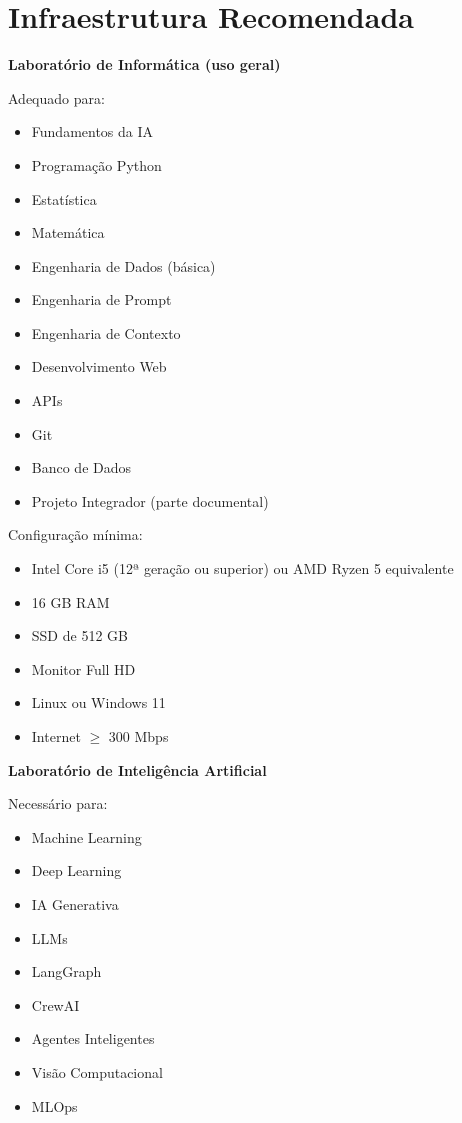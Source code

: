 \section{Infraestrutura Recomendada}

\textbf{Laboratório de Informática (uso geral)}

Adequado para:
\begin{itemize}
    \item Fundamentos da IA
    \item Programação Python
    \item Estatística
    \item Matemática
    \item Engenharia de Dados (básica)
    \item Engenharia de Prompt
    \item Engenharia de Contexto
    \item Desenvolvimento Web
    \item APIs
    \item Git
    \item Banco de Dados
    \item Projeto Integrador (parte documental)
\end{itemize}

Configuração mínima:
\begin{itemize}
    \item Intel Core i5 (12ª geração ou superior) ou AMD Ryzen 5 equivalente
    \item 16 GB RAM
    \item SSD de 512 GB
    \item Monitor Full HD
    \item Linux ou Windows 11
    \item Internet $\geq$ 300 Mbps
\end{itemize}

\textbf{Laboratório de Inteligência Artificial}

Necessário para:
\begin{itemize}
    \item Machine Learning
    \item Deep Learning
    \item IA Generativa
    \item LLMs
    \item LangGraph
    \item CrewAI
    \item Agentes Inteligentes
    \item Visão Computacional
    \item MLOps
\end{itemize}

